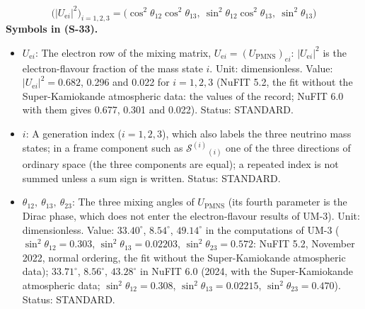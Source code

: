 \documentclass[
  10pt,
]{article}
\providecommand{\tightlist}{%
  \setlength{\itemsep}{0pt}\setlength{\parskip}{0pt}}
\begin{document}
\[
\big(\lvert U_{\mathrm{e}i}\rvert^2\big)_{i = 1, 2, 3} = \big(\cos^2\theta_{12}\cos^2\theta_{13},\ \sin^2\theta_{12}\cos^2\theta_{13},\ \sin^2\theta_{13}\big) \tag{S-33}
\] \textbf{Symbols in (S-33).}

\begin{itemize}
\tightlist
\item
  \(U_{\mathrm{e}i}\): The electron row of the mixing matrix,
  \(U_{\mathrm{e}i} = (U_{\mathrm{PMNS}})_{ei}\):
  \(\lvert U_{\mathrm{e}i}\rvert^2\) is the electron-flavour fraction of
  the mass state \(i\). Unit: dimensionless. Value:
  \(\lvert U_{\mathrm{e}i}\rvert^2 = 0.682\), 0.296 and 0.022 for
  \(i = 1, 2, 3\) (NuFIT 5.2, the fit without the Super-Kamiokande
  atmospheric data: the values of the record; NuFIT 6.0 with them gives
  0.677, 0.301 and 0.022). Status: STANDARD.
\item
  \(i\): A generation index (\(i = 1, 2, 3\)), which also labels the
  three neutrino mass states; in a frame component such as
  \(\mathcal{S}^{(i)}{}_{(i)}\) one of the three directions of ordinary
  space (the three components are equal); a repeated index is not summed
  unless a sum sign is written. Status: STANDARD.
\item
  \(\theta_{12},\ \theta_{13},\ \theta_{23}\): The three mixing angles
  of \(U_{\mathrm{PMNS}}\) (its fourth parameter is the Dirac phase,
  which does not enter the electron-flavour results of UM-3). Unit:
  dimensionless. Value: \(33.40^\circ\), \(8.54^\circ\), \(49.14^\circ\)
  in the computations of UM-3 (\(\sin^2\theta_{12} = 0.303\),
  \(\sin^2\theta_{13} = 0.02203\), \(\sin^2\theta_{23} = 0.572\): NuFIT
  5.2, November 2022, normal ordering, the fit without the
  Super-Kamiokande atmospheric data); \(33.71^\circ\), \(8.56^\circ\),
  \(43.28^\circ\) in NuFIT 6.0 (2024, with the Super-Kamiokande
  atmospheric data; \(\sin^2\theta_{12} = 0.308\),
  \(\sin^2\theta_{13} = 0.02215\), \(\sin^2\theta_{23} = 0.470\)).
  Status: STANDARD.
\end{itemize}
\end{document}
